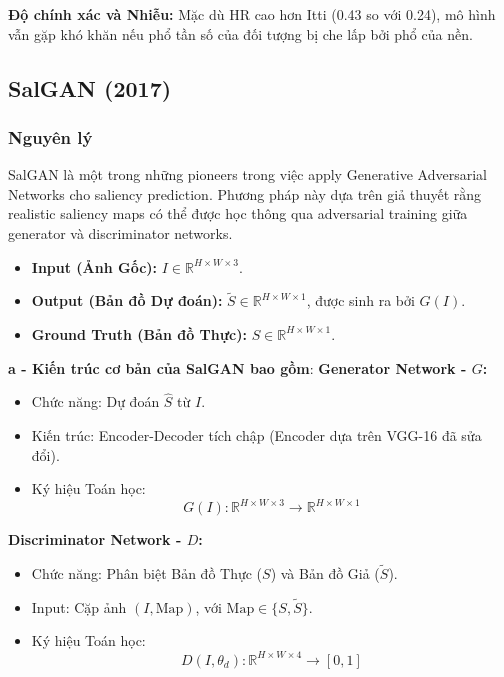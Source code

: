 \textbf{Độ chính xác và Nhiễu:} Mặc dù HR cao hơn Itti (0.43 so với 0.24), mô hình vẫn gặp khó khăn nếu phổ tần số của đối tượng bị che lấp bởi phổ của nền.

\newpage
\subsection{SalGAN (2017)}

\subsubsection{Nguyên lý}

SalGAN \cite{salgan_2017} là một trong những pioneers trong việc apply Generative Adversarial Networks cho saliency prediction. Phương pháp này dựa trên giả thuyết rằng realistic saliency maps có thể được học thông qua adversarial training giữa generator và discriminator networks.

\begin{itemize}
    \item \textbf{Input (Ảnh Gốc):} $I \in \mathbb{R}^{H \times W \times 3}$.
    \item \textbf{Output (Bản đồ Dự đoán):} $\tilde{S} \in \mathbb{R}^{H \times W \times 1}$, được sinh ra bởi $G(I)$.
    \item \textbf{Ground Truth (Bản đồ Thực):} $S \in \mathbb{R}^{H \times W \times 1}$.
\end{itemize}

\noindent \textbf{a - Kiến trúc cơ bản của SalGAN bao gồm}:
\noindent \textbf{Generator Network - $G$:} 
\begin{itemize}
    \item Chức năng: Dự đoán $\hat{S}$ từ $I$.
    \item Kiến trúc: Encoder-Decoder tích chập (Encoder dựa trên VGG-16 đã sửa đổi).
    \item Ký hiệu Toán học:
    $$G(I): \mathbb{R}^{H \times W \times 3} \rightarrow \mathbb{R}^{H \times W \times 1}$$
\end{itemize}


\noindent \textbf{Discriminator Network - $D$:} 
\begin{itemize}
    \item Chức năng: Phân biệt Bản đồ Thực ($S$) và Bản đồ Giả ($\tilde{S}$).
    \item Input: Cặp ảnh $(I, \text{Map})$, với $\text{Map} \in \{S, \tilde{S}\}$.
    \item Ký hiệu Toán học: 
    $$D(I,  \theta_d): \mathbb{R}^{H \times W \times 4} \rightarrow [0, 1]$$
\end{itemize}

